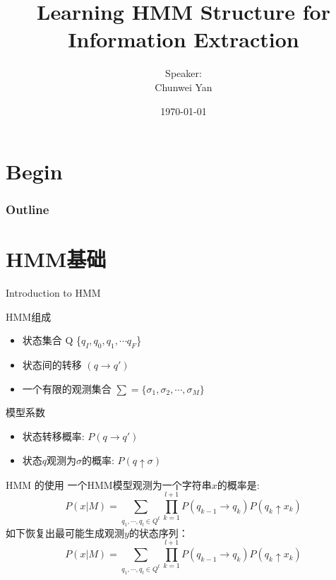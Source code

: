 \documentclass{beamer}
\title{Learning HMM Structure for Information Extraction}
\author{Speaker:\\Chunwei Yan}
\institute[PKUSZ]{
    互联网研发中心\\
}
\date{\today}
\begin{document}
\begin{frame}
  \titlepage
\end{frame}

\section{Begin}
\begin{frame}
\frametitle{Outline}
\tableofcontents
\end{frame}

\section{HMM基础}
\begin{frame}{Introduction to HMM}
\begin{block}{HMM组成 }
    \begin{itemize}
        \item 状态集合 Q \{$q_I, q_0, q_1, \cdots q_F$\}
        \item 状态间的转移 $(q \rightarrow q')$
        \item 一个有限的观测集合 $\sum = \{ \sigma_1, \sigma_2, \cdots, \sigma_M\}$
    \end{itemize}
\end{block}

\begin{block}{模型系数}
\begin{itemize}
    \item 状态转移概率: $P(q \rightarrow q')$
    \item 状态$q$观测为$\sigma$的概率: $P(q \uparrow \sigma)$ 
\end{itemize}
\end{block}
\end{frame}

\begin{frame}{HMM 的使用}
    一个HMM模型观测为一个字符串$x$的概率是:
    \begin{equation}
    P(x|M) = \sum_{q_1,\cdots,q_l \in Q^t} {
        \prod_{k=1}^{l+1}{
            P(q_{k-1} \rightarrow q_k) P(q_k \uparrow x_k)
        }
    }
    \end{equation}
    如下恢复出最可能生成观测$y$的状态序列：
    \begin{equation}
    P(x|M) = \sum_{q_1,\cdots,q_l \in Q^t} {
        \prod_{k=1}^{l+1}{
            P(q_{k-1} \rightarrow q_k) P(q_k \uparrow x_k)
        }
    }
    \end{equation}
\end{frame}
\end{document}
